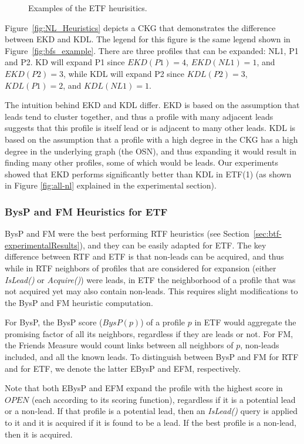 \documentclass[prodmode,acmtecs]{acmsmall} %
\newcommand{\islead}[1]{{\em IsLead(#1)}}
\newcommand{\acquire}[1]{{\em Acquire(#1)}}
\begin{document}
\begin{figure}
\caption{Examples of the ETF heurisitics.}
\label{fig:efm-and-ebysp}

\end{figure}


Figure~\ref{fig:NL_Heuristics} depicts a CKG that demonstrates the difference between EKD and KDL. The legend for this figure is the same legend shown in Figure~\ref{fig:bfs_example}. There are three profiles that can be
expanded: NL1, P1 and P2. KD will expand P1 since $EKD(P1)=4$, $EKD(NL1)=1$, and
$EKD(P2)=3$, while KDL will expand P2 since $KDL(P2)=3$, $KDL(P1)=2$, and
$KDL(NL1)=1$.


The intuition behind EKD and KDL differ. EKD is based on the assumption that
leads tend to cluster together, and thus a profile with many adjacent leads
suggests that this profile is itself lead or is adjacent to many other leads.
KDL is based on the assumption that a profile with a high degree in the CKG has
a high degree in the underlying graph (the OSN), and thus expanding it would
result in finding many other profiles, some of which would be leads.
Our experiments showed that EKD performs significantly better than
KDL in ETF(1) (as shown in Figure \ref{fig:all-nl} explained in the
experimental section).

\subsubsection{BysP and FM Heuristics for ETF}



BysP and FM were the best performing RTF heuristics (see Section~\ref{sec:btf-experimentalResults}), and they can be easily adapted for ETF. The key difference between RTF and ETF is that non-leads can be acquired, and thus while in RTF neighbors of profiles that are considered for expansion (either \islead{} or \acquire{}) were leads, in ETF the neighborhood of a profile that was not acquired yet may also contain non-leads. This requires slight modifications to the BysP and FM heuristic computation. 

For BysP, the BysP score ($BysP(p)$) of a profile $p$ in ETF would aggregate the promising factor of all its neighbors, regardless if they are leads or not. For FM, the Friends Measure would count links between all neighbors of $p$, non-leads included, and all the known leads. To distinguish between BysP and FM for RTF and for ETF, we denote the latter EBysP and EFM, respectively.

Note that both EBysP and EFM expand the profile with the highest score in $OPEN$ (each according to its scoring function), regardless if it is a potential lead or a non-lead. If that profile is a potential lead, then an \islead{} query is applied to it and it is acquired if it is found to be a lead. If the best profile is a non-lead, then it is acquired. 
\end{document}
